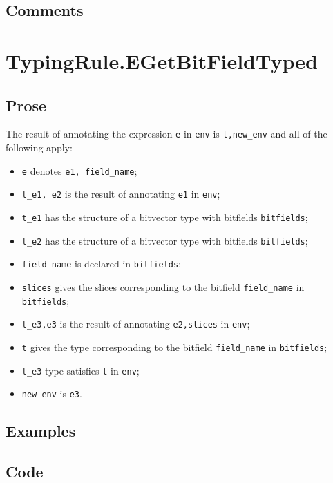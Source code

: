 \documentclass{book}
\begin{document}
  \subsection{Comments}

\section{TypingRule.EGetBitFieldTyped \label{sec:TypingRule.EGetBitFieldTyped}}

  \subsection{Prose}
  The result of annotating the expression \texttt{e} in \texttt{env} is
\texttt{t,new\_env} and all of the following apply:
  \begin{itemize}
  \item \texttt{e} denotes \texttt{e1, field\_name};
  \item \texttt{t\_e1, e2} is the result of annotating \texttt{e1} in \texttt{env};
  \item \texttt{t\_e1} has the structure of a bitvector type with bitfields \texttt{bitfields};
  \item \texttt{t\_e2} has the structure of a bitvector type with bitfields \texttt{bitfields};
  \item \texttt{field\_name} is declared in \texttt{bitfields};
  \item \texttt{slices} gives the slices corresponding to the bitfield \texttt{field\_name} in
    \texttt{bitfields};
  \item \texttt{t\_e3,e3} is the result of annotating \texttt{e2,slices} in \texttt{env};
  \item \texttt{t} gives the type corresponding to the bitfield \texttt{field\_name} in \texttt{bitfields};
  \item \texttt{t\_e3} type-satisfies \texttt{t} in \texttt{env};
  \item \texttt{new\_env} is \texttt{e3}.
  \end{itemize}

  \subsection{Examples}

  \subsection{Code}
\end{document}
